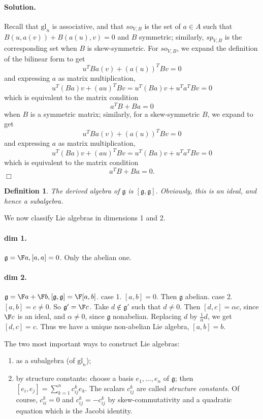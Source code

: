 \documentclass[11pt]{article}
\newcommand{\gl}{\mbox{gl}}
\newcommand{\g}{\mathfrak{g}}
\newcommand{\sk}{\vspace*{1em}}
\newtheorem{defn}{Definition}
\begin{document}
\paragraph{Solution.} 
Recall that $\gl_n$ is associative, and that $so_{V,B}$ is the
set of $a \in A$ such that $B(u, a(v)) + B(a(u), v) = 0$ and $B$ symmetric;
similarly, $sp_{V,B}$ is the corresponding set when $B$ is skew-symmetric.
For $so_{V,B}$, we expand the definition of the bilinear form to get
\[ u^T B a(v) + (a(u))^T B v = 0 \] 
and expressing $a$ as matrix multiplication,
\[ u^T (Ba) v + (au)^T Bv = 
u^T (Ba) v + u^T a^TB v =
0 \] 
which is equivalent to the matrix condition
\[ a^T B + Ba = 0 \]
when $B$ is a symmetric matrix; similarly, for a skew-symmetric $B$,
we expand to get
\[ u^T B a(v) + (a(u))^T B v = 0 \] 
and expressing $a$ as matrix multiplication,
\[ u^T (Ba) v + (au)^T Bv = 
u^T (Ba) v + u^T a^TB v =
0 \] 
which is equivalent to the matrix condition
\[ a^T B + Ba = 0. \]
$\Box$

\begin{defn}
The \emph{derived algebra} of $\g$ is $[\g, \g]$.  Obviously, this
is an ideal, and hence a subalgebra.
\end{defn}

We now classify Lie algebras in dimensions 1 and 2.

\paragraph{dim 1.} $\g = \F a, [a, a] = 0$.  Only the abelian one.

\paragraph{dim 2.} $\g = \F a + \F b, [\g, \g] = \F[a,b]$.  
case 1.  $[a,b] = 0$.  Then $\g$ abelian.  case 2. $[a,b] = c \neq 0$.
So $\g' = \F c$.  Take $d \not\in \g'$ such that $d \neq 0$.  Then 
$[d, c] = 
\alpha c$, since $\F c$ is an ideal, and $\alpha \neq 0$, since $\g$ nonabelian.
Replacing $d$ by $\frac{1}{\alpha}d$, we get $[d, c] = c$.  Thus we have
a unique non-abelian Lie algebra, $[a, b] = b$.

\sk\noindent
The two most important ways to construct Lie algebras:
\begin{enumerate}
\item as a subalgebra (of $\gl_n$);
\item by structure constants: choose a basis $e_1, \ldots, e_n$ of $\g$;
then $[e_i, e_j] = \sum_{k=1}^n c_{ij}^k e_k$.  The scalars $c_{ij}^k$
are called \emph{structure constants}.  Of course, $c_{ii}^k = 0$ and
$c_{ij}^k = -c_{ij}^k$ by skew-commutativity and a quadratic equation 
which is the Jacobi identity.
\end{enumerate}
\end{document}
